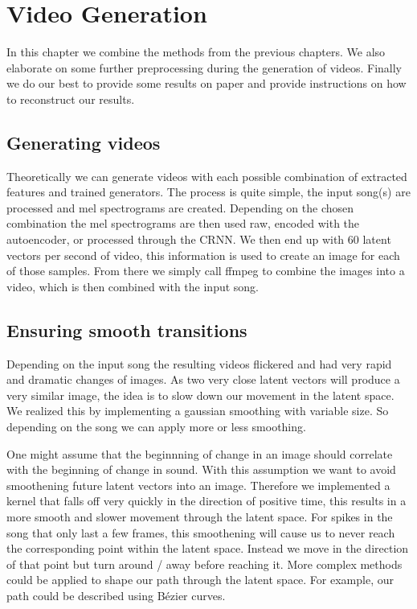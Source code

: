 \chapter{Video Generation}\label{ch:results}

    In this chapter we combine the methods from the previous chapters. We also elaborate on some further preprocessing during the generation of videos. Finally we do our best to provide some results on paper and provide instructions on how to reconstruct our results.

    \section{Generating videos}
        
        Theoretically we can generate videos with each possible combination of extracted features and trained generators. The process is quite simple, the input song(s) are processed and mel spectrograms are created. Depending on the chosen combination the mel spectrograms are then used raw, encoded with the autoencoder, or processed through the CRNN. We then end up with 60 latent vectors per second of video, this information is used to create an image for each of those samples. From there we simply call ffmpeg to combine the images into a video, which is then combined with the input song.

    \section{Ensuring smooth transitions}
        
        Depending on the input song the resulting videos flickered and had very rapid and dramatic changes of images. As two very close latent vectors will produce a very similar image, the idea is to slow down our movement in the latent space. We realized this by implementing a gaussian smoothing with variable size. So depending on the song we can apply more or less smoothing.
        
        One might assume that the beginnning of change in an image should correlate with the beginning of change in sound. With this assumption we want to avoid smoothening future latent vectors into an image. Therefore we implemented a kernel that falls off very quickly in the direction of positive time, this results in a more smooth and slower movement through the latent space. For spikes in the song that only last a few frames, this smoothening will cause us to never reach the corresponding point within the latent space. Instead we move in the direction of that point but turn around / away before reaching it. More complex methods could be applied to shape our path through the latent space. For example, our path could be described using Bézier curves.


